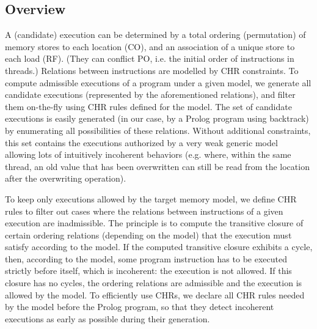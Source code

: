 \subsection{Overview}\label{subsec:overview}
A (candidate) execution can be determined by a
total ordering (permutation) of memory stores to each location (CO),
and an association of a unique store to each load (RF).  (They can
conflict PO, i.e. the initial order of instructions in threads.)  Relations
between instructions are modelled by CHR
constraints. %
To compute admissible executions of a program under a given model, we
generate all candidate executions (represented by the aforementioned
relations), and filter them on-the-fly using CHR rules defined for the
model.  The set of candidate executions is easily generated (in our
case, by a Prolog program using backtrack) by enumerating all
possibilities of these relations.  Without additional constraints,
this set contains the executions authorized by a very weak generic
model~\cite{AMT2014:TPLS} allowing lots of intuitively incoherent
behaviors (e.g. where, within the same thread, an old value that has been overwritten 
can still be read from the location after the overwriting operation).

To keep only executions allowed by the target memory model, 
we define CHR rules to filter out cases where the relations between 
instructions of a given execution are inadmissible. 
The principle is to compute the transitive closure of certain ordering 
relations (depending on the model) that the execution must satisfy according 
to the model. If the computed transitive closure exhibits a cycle, 
then, according to the model, some program instruction
has to be executed strictly before itself, which is incoherent: the execution
is not allowed. If this closure has no cycles, the ordering relations 
are admissible and the execution is allowed by the model.
To efficiently use CHRs, we declare all CHR rules needed by the model before
the Prolog program, so that they detect incoherent executions 
as early as possible during their generation.

